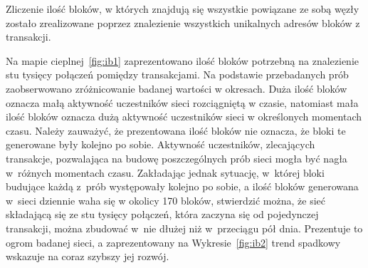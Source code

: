 \documentclass[12pt, oneside, final, openany]{mgr}
\begin{document}
\indent Zliczenie ilość bloków, w których znajdują się wszystkie powiązane ze sobą węzły zostało zrealizowane poprzez znalezienie wszystkich unikalnych adresów bloków z transakcji.

\indent Na mapie cieplnej~\ref{fig:ib1} zaprezentowano ilość bloków potrzebną na znalezienie stu tysięcy połączeń pomiędzy transakcjami. Na podstawie przebadanych prób zaobserwowano zróżnicowanie badanej wartości w okresach. Duża ilość bloków oznacza małą aktywność uczestników sieci rozciągniętą w czasie, natomiast mała ilość bloków oznacza dużą aktywność uczestników sieci w określonych momentach czasu. Należy zauważyć, że prezentowana ilość bloków nie oznacza, że bloki te generowane były kolejno po sobie. Aktywność uczestników, zlecających transakcje, pozwalająca na budowę poszczególnych prób sieci mogła być nagła w~różnych momentach czasu. Zakładając jednak sytuację, w~której bloki budujące każdą z~prób występowały kolejno po sobie, a ilość bloków generowana w~sieci dziennie waha się w okolicy 170 bloków, stwierdzić można, że sieć składającą się ze stu tysięcy połączeń, która zaczyna się od pojedynczej transakcji, można zbudować w~nie dłużej niż w~przeciągu pół dnia. Prezentuje to ogrom badanej sieci, a zaprezentowany na Wykresie~\ref{fig:ib2} trend spadkowy wskazuje na coraz szybszy jej rozwój. 
\end{document}
